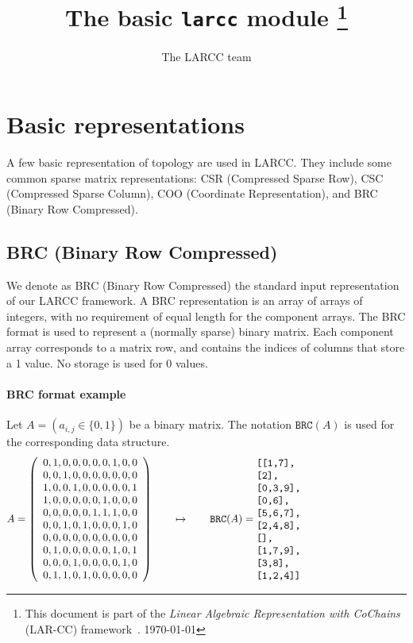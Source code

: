 \documentclass[11pt,oneside]{article}	%
\title{The basic \texttt{larcc} module
\footnote{This document is part of the \emph{Linear Algebraic Representation with CoChains} (LAR-CC) framework~\cite{cclar-proj:2013:00}. \today}
}
\author{The LARCC team}
\def\mat#1{{\left(\begin{array}{cccccccccccccccccccc}#1\end{array}\right)}}
\begin{document}
\maketitle
\nonstopmode

\tableofcontents
\newpage


\section{Basic representations}

A few basic representation of topology are used in LARCC. They include some common sparse matrix representations: CSR (Compressed Sparse Row),  CSC (Compressed Sparse Column),   COO (Coordinate Representation), and BRC (Binary Row Compressed). 

\subsection{BRC (Binary Row Compressed)}

We denote as BRC (Binary Row Compressed) the standard input representation of our LARCC framework. A BRC representation is an array of arrays of integers, with no requirement of equal length for the component arrays. The BRC format is used to represent a (normally sparse) binary matrix. Each component array corresponds to a matrix row, and contains the indices of columns that store a 1 value. No storage is used for 0 values.

\paragraph{BRC format example}

Let $A = (a_{i,j} \in \{0,1\})$ be a binary matrix. The notation $\texttt{BRC}(A)$ is used for the corresponding data structure.
\[
A = \mat{
0,1,0,0,0,0,0,1,0,0\\
0,0,1,0,0,0,0,0,0,0\\
1,0,0,1,0,0,0,0,0,1\\
1,0,0,0,0,0,1,0,0,0\\
0,0,0,0,0,1,1,1,0,0\\
0,0,1,0,1,0,0,0,1,0\\
0,0,0,0,0,0,0,0,0,0\\
0,1,0,0,0,0,0,1,0,1\\
0,0,0,1,0,0,0,0,1,0\\
0,1,1,0,1,0,0,0,0,0\\
}
\qquad\mapsto\qquad \texttt{BRC}(A) =
\begin{minipage}[c]{5cm}
\begin{verbatim}
[[1,7],
 [2],
 [0,3,9],
 [0,6],
 [5,6,7],
 [2,4,8],
 [],
 [1,7,9],
 [3,8],
 [1,2,4]]
\end{verbatim}
\end{minipage}
\]
\end{document}
